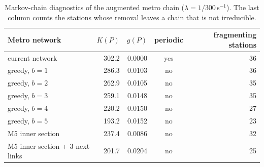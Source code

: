 \begin{table}[htbp]
\centering
\footnotesize
\begin{tabular}{lrrcr}
\toprule
Metro network & $K(P)$ & $g(P)$ & periodic & fragmenting stations \\
\midrule
current network & 302.2 & 0.0000 & yes & 36 \\
greedy, $b=1$ & 286.3 & 0.0103 & no & 36 \\
greedy, $b=2$ & 262.9 & 0.0105 & no & 35 \\
greedy, $b=3$ & 259.1 & 0.0148 & no & 35 \\
greedy, $b=4$ & 220.2 & 0.0150 & no & 27 \\
greedy, $b=5$ & 193.2 & 0.0152 & no & 23 \\
M5 inner section & 237.4 & 0.0086 & no & 32 \\
M5 inner section + 3 next links & 201.7 & 0.0204 & no & 25 \\
\bottomrule
\end{tabular}
\caption{Markov-chain diagnostics of the augmented metro chain ($\lambda=1/300$\,s$^{-1}$). The last column counts the stations whose removal leaves a chain that is not irreducible.}
\label{tab:aug-chain}
\end{table}
